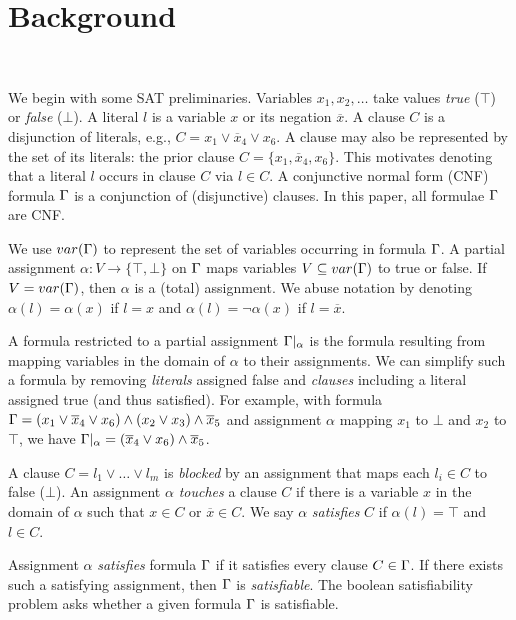 \section{Background}~\label{sec:background}

We begin with some SAT preliminaries. Variables $x_1, x_2, \dots$ take values
\emph{true} ($\top$) or \emph{false} ($\bot$). A literal $l$ is a variable $x$
or its negation $\overline{x}$. A clause $C$ is a disjunction of literals, e.g.,
$C = x_1 \lor \overline{x}_4 \lor x_6$. A clause may also be represented by the
set of its literals: the prior clause $C = \{x_1, \overline{x}_4, x_6\}$. This
motivates denoting that a literal $l$ occurs in clause $C$ via $l \in C$. A
conjunctive normal form (CNF) formula $\Gamma$ is a conjunction of
(disjunctive) clauses. In this paper, all formulae $\Gamma$ are CNF.

We use $var(\Gamma)$ to represent the set of variables occurring in formula
$\Gamma$. A partial assignment $\alpha : V \rightarrow \{\top, \bot\}$ on
$\Gamma$ maps variables $V \subseteq var(\Gamma)$ to true or false. If $V =
var(\Gamma)$, then $\alpha$ is a (total) assignment. We abuse notation by
denoting $\alpha(l) = \alpha(x)$ if $l = x$ and $\alpha(l) = \neg \alpha(x)$ if
$l = \overline{x}$.

A formula restricted to a partial assignment $\Gamma|_\alpha$ is the formula
resulting from mapping variables in the domain of $\alpha$ to their assignments.
We can simplify such a formula by removing \emph{literals} assigned false and
\emph{clauses} including a literal assigned true (and thus satisfied). For
example, with formula $\Gamma = (x_1 \lor \overline{x}_4 \lor x_6) \land (x_2
\lor x_3) \land \overline{x}_5$ and assignment $\alpha$ mapping $x_1$ to $\bot$
and $x_2$ to $\top$, we have $\Gamma|_\alpha = (\overline{x}_4 \lor x_6) \land
\overline{x}_5$.

A clause $C = l_1 \lor \dots \lor l_m$ is \emph{blocked} by an assignment that
maps each $l_i \in C$ to false ($\bot$). An assignment $\alpha$ \emph{touches} a
clause $C$ if there is a variable $x$ in the domain of $\alpha$ such that $x \in
C$ or $\overline{x} \in C$. We say $\alpha$ \emph{satisfies} $C$ if $\alpha(l) =
\top$ and $l \in C$.

Assignment $\alpha$ \emph{satisfies} formula $\Gamma$ if it satisfies every
clause $C \in \Gamma$. If there exists such a satisfying assignment, then
$\Gamma$ is \emph{satisfiable}. The boolean satisfiability problem asks
whether a given formula $\Gamma$ is satisfiable.

